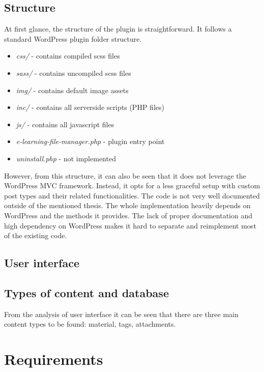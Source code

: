 \documentclass[
  digital,     %
  oneside,     %
  nosansbold,  %
  colorbold, %
  lof,         %
  lot,         %
]{fithesis4}
\begin{document}
\subsection{Structure}
\label{subsect:plugin-structure}

At first glance, the structure of the plugin is straightforward. It follows a standard WordPress plugin folder structure.

\begin{itemize}
	\item \textit{css/} - contains compiled scss files
	\item \textit{sass/} - contains uncompiled scss files
	\item \textit{img/} - contains default image assets
	\item \textit{inc/} - contains all serverside scripts (PHP files)
	\item \textit{js/} - contains all javascript files
	\item \textit{e-learning-file-manager.php} - plugin entry point
	\item \textit{uninstall.php} - not implemented
\end{itemize}

However, from this structure, it can also be seen that it does not leverage the WordPress MVC framework. Instead, it opts for a less graceful setup with custom post types and their related functionalities. The code is not very well documented outside of the mentioned thesis. The whole implementation heavily depends on WordPress and the methods it provides. The lack of proper documentation and high dependency on WordPress makes it hard to separate and reimplement most of the existing code.

\subsection{User interface}

\subsection{Types of content and database}

From the analysis of user interface it can be seen that there are three main content types to be found: material, tags, attachments. 

\section{Requirements}
\end{document}
